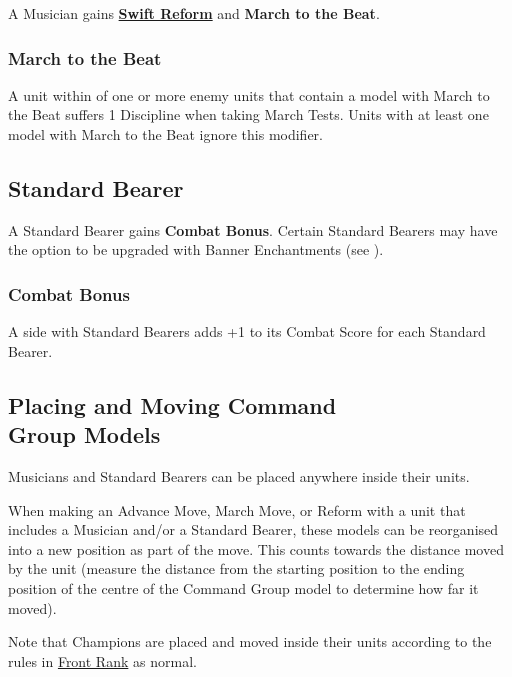 A Musician gains \hyperref[swift_reform]{\textbf{Swift Reform}} and \textbf{March to the Beat}.

\subsubsection{March to the Beat}
\label{march_to_the_beat}

A unit within  of one or more enemy units that contain a model with March to the Beat suffers \minuss{}1 Discipline when taking March Tests. Units with at least one model with March to the Beat ignore this modifier.

\subsection{Standard Bearer}
\label{standard_bearer}

A Standard Bearer gains \textbf{Combat Bonus}. Certain Standard Bearers may have the option to be upgraded with Banner Enchantments (see ).

\subsubsection{Combat Bonus}
\label{combat_bonus_CG}

A side with Standard Bearers adds +1 to its Combat Score for each Standard Bearer.

\columnbreak

\subsection[Placing and Moving Command Group Models]{Placing and Moving Command\\ Group Models}
\label{moving_command_group_models}

Musicians and Standard Bearers can be placed anywhere inside their units.

When making an Advance Move, March Move, or Reform with a unit that includes a Musician and/or a Standard Bearer, these models can be reorganised into a new position as part of the move. This counts towards the distance moved by the unit (measure the distance from the starting position to the ending position of the centre of the Command Group model to determine how far it moved).

Note that Champions are placed and moved inside their units according to the rules in \hyperref[front_rank]{Front Rank} as normal.

